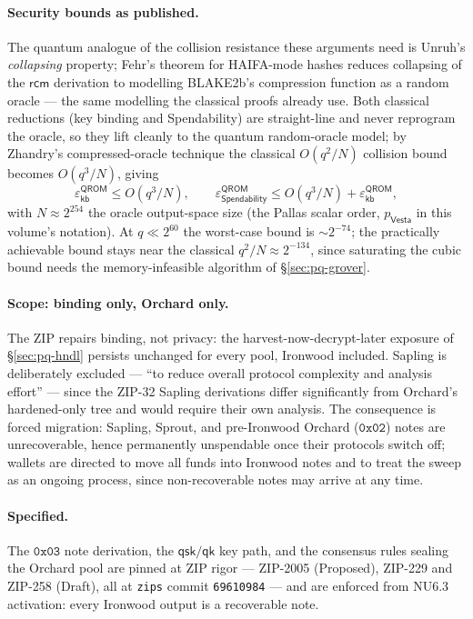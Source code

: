 \documentclass[11pt,a4paper]{article}
\theoremstyle{definition}
\newcommand{\Vesta}{\ensuremath{\mathsf{Vesta}}}
\newcommand{\rcm}{\ensuremath{\mathsf{rcm}}}
\begin{document}
\paragraph{Security bounds as published.} The quantum analogue of the
collision resistance these arguments need is Unruh's \emph{collapsing}
property; Fehr's theorem for HAIFA-mode hashes reduces collapsing of the
$\rcm$ derivation to modelling BLAKE2b's compression function as a random
oracle --- the same modelling the classical proofs already use. Both classical
reductions (key binding and Spendability) are straight-line and never
reprogram the oracle, so they lift cleanly to the quantum random-oracle model;
by Zhandry's compressed-oracle technique the classical $O(q^2/N)$ collision
bound becomes $O(q^3/N)$, giving
\[
\varepsilon^{\mathsf{QROM}}_{\mathsf{kb}} \le O(q^3/N), \qquad
\varepsilon^{\mathsf{QROM}}_{\mathsf{Spendability}} \le O(q^3/N) +
\varepsilon^{\mathsf{QROM}}_{\mathsf{kb}},
\]
with $N \approx 2^{254}$ the oracle output-space size (the Pallas scalar
order, $p_{\Vesta}$ in this volume's notation). At $q \ll 2^{60}$ the
worst-case bound is ${\sim}2^{-74}$; the practically achievable bound stays
near the classical $q^2/N \approx 2^{-134}$, since saturating the cubic bound
needs the memory-infeasible algorithm of \S\ref{sec:pq-grover}.

\paragraph{Scope: binding only, Orchard only.} The ZIP repairs binding, not
privacy: the harvest-now-decrypt-later exposure of \S\ref{sec:pq-hndl}
persists unchanged for every pool, Ironwood included. Sapling is deliberately
excluded --- ``to reduce overall protocol complexity and analysis effort'' ---
since the ZIP-32 Sapling derivations differ significantly from Orchard's
hardened-only tree and would require their own analysis. The consequence is
forced migration:
Sapling, Sprout, and pre-Ironwood Orchard ($\mathtt{0x02}$) notes are
unrecoverable, hence permanently unspendable once their protocols switch off;
wallets are directed to move all funds into Ironwood notes and to treat the
sweep as an ongoing process, since non-recoverable notes may arrive at any
time.

\paragraph{Specified.} The $\mathtt{0x03}$ note derivation, the
$\mathsf{qsk}/\mathsf{qk}$ key path, and the consensus rules sealing the
Orchard pool are pinned at ZIP rigor --- ZIP-2005 (Proposed), ZIP-229 and
ZIP-258 (Draft), all at \texttt{zips} commit \texttt{69610984} --- and are
enforced from NU6.3 activation: every Ironwood output is a recoverable note.
\end{document}
